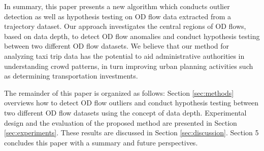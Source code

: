 \documentclass[a4paper,UKenglish]{lipics-v2018}
\begin{document}
In summary, this paper presents a new algorithm which conducts outlier detection as well as hypothesis testing on OD flow data extracted from a trajectory dataset.
Our approach investigates the central regions of OD flows, based on data depth, to detect OD flow anomalies and conduct hypothesis testing between two different OD flow datasets.
We believe that our method for analyzing taxi trip data has the potential to aid administrative authorities in understanding crowd patterns, in turn improving urban planning activities such as determining transportation investments. 

The remainder of this paper is organized as follows: Section \ref{sec:methods} overviews how to detect OD flow outliers and conduct hypothesis testing between two different OD flow datasets using the concept of data depth. 
Experimental design and the evaluation of the proposed method are presented in Section \ref{sec:experiments}. 
These results are discussed in Section \ref{sec:discussion}. 
Section 5 concludes this paper with a summary and future perspectives.

%
\end{document}
